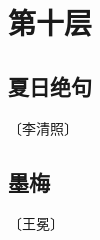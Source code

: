 \documentclass[12pt,UTF-8,openany]{ctexbook}
\begin{document}
\vspace{8pt}


\chapter{第十层}

\section{夏日绝句}

\begin{center}
    \vspace{10pt}
    
    \begin{normalsize}
        
        〔李清照〕
        
    \end{normalsize}
    
    \vspace{8pt}
    
    \begin{large}
        
        
        
    \end{large}
    
\end{center}

\vspace{8pt}


\section{墨梅}

\begin{center}
    \vspace{10pt}
    
    \begin{normalsize}
        
        〔王冕〕
        
    \end{normalsize}
    
    \vspace{8pt}
    
    \begin{large}
        
        
        
    \end{large}
    
\end{center}
\end{document}
